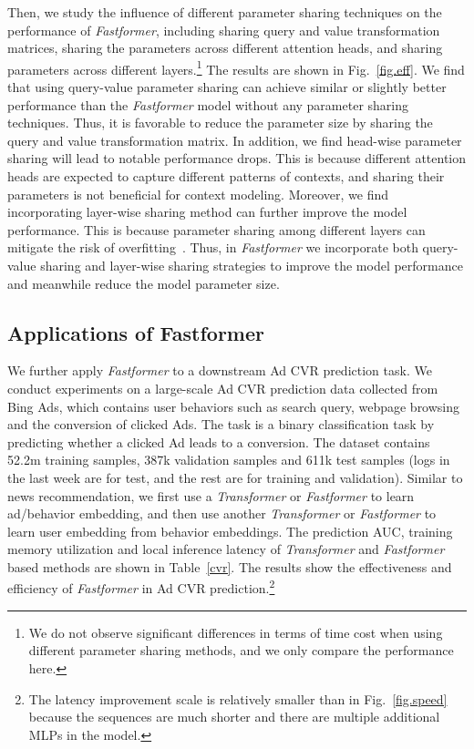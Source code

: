 \documentclass[11pt,a4paper]{article}
\begin{document}
Then, we study the influence of different parameter sharing techniques on the performance of \textit{Fastformer}, including sharing query and value transformation matrices, sharing the parameters across different attention heads, and sharing parameters across different layers.\footnote{We do not observe significant differences in terms of time cost when using different parameter sharing methods, and we only compare the performance here.}
The results are shown in Fig.~\ref{fig.eff}.
We find that using query-value parameter sharing can achieve similar or slightly better performance than the \textit{Fastformer} model without any parameter sharing techniques.
Thus, it is favorable to reduce the parameter size by sharing the query and value transformation matrix.
In addition, we find head-wise parameter sharing will lead to  notable performance drops.
This is because different attention heads are expected to capture different patterns of contexts, and sharing their parameters is not beneficial for context modeling.
Moreover, we find incorporating layer-wise sharing method can further improve the model performance.
This is because parameter sharing among different layers can mitigate the risk of overfitting~\cite{Lan2020albert}.
Thus, in \textit{Fastformer} we incorporate both query-value sharing and layer-wise sharing strategies to improve the model performance and meanwhile reduce the model parameter size.



\subsection{Applications of Fastformer}

We further apply \textit{Fastformer} to a downstream Ad CVR prediction task.
We conduct experiments on a large-scale Ad CVR prediction data collected from Bing Ads, which contains user behaviors such as search query,  webpage browsing and the conversion of clicked Ads.
The task is a binary classification task by predicting whether a clicked Ad leads to a conversion.
The dataset contains 52.2m training samples, 387k validation samples and 611k test samples (logs in the last week are for test, and the rest are for training and validation).
Similar to news recommendation, we first use a \textit{Transformer} or \textit{Fastformer} to learn ad/behavior embedding, and then use another \textit{Transformer} or \textit{Fastformer} to learn user embedding from behavior embeddings.
The prediction AUC, training memory utilization and local inference latency of \textit{Transformer} and \textit{Fastformer} based methods are shown in Table~\ref{cvr}.
The results show the effectiveness and efficiency of \textit{Fastformer} in Ad CVR prediction.\footnote{The latency improvement scale is relatively smaller than in Fig.~\ref{fig.speed} because the sequences are much shorter and there are multiple additional MLPs in the model.}
\end{document}
